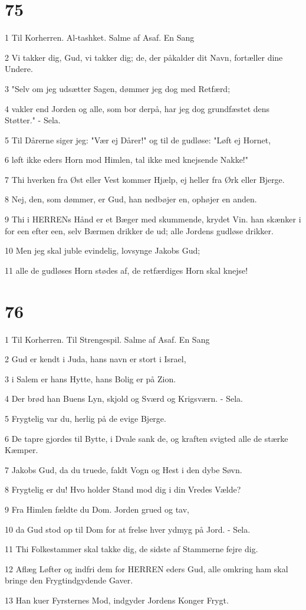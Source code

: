 \chapter{75}

\par 1 Til Korherren. Al-tashket. Salme af Asaf. En Sang
\par 2 Vi takker dig, Gud, vi takker dig; de, der påkalder dit Navn, fortæller dine Undere.
\par 3 "Selv om jeg udsætter Sagen, dømmer jeg dog med Retfærd;
\par 4 vakler end Jorden og alle, som bor derpå, har jeg dog grundfæstet dens Støtter." - Sela.
\par 5 Til Dårerne siger jeg: "Vær ej Dårer!" og til de gudløse: "Løft ej Hornet,
\par 6 løft ikke eders Horn mod Himlen, tal ikke med knejsende Nakke!"
\par 7 Thi hverken fra Øst eller Vest kommer Hjælp, ej heller fra Ørk eller Bjerge.
\par 8 Nej, den, som dømmer, er Gud, han nedbøjer en, ophøjer en anden.
\par 9 Thi i HERRENs Hånd er et Bæger med skummende, krydet Vin. han skænker i for een efter een, selv Bærmen drikker de ud; alle Jordens gudløse drikker.
\par 10 Men jeg skal juble evindelig, lovsynge Jakobs Gud;
\par 11 alle de gudløses Horn stødes af, de retfærdiges Horn skal knejse!

\chapter{76}

\par 1 Til Korherren. Til Strengespil. Salme af Asaf. En Sang
\par 2 Gud er kendt i Juda, hans navn er stort i Israel,
\par 3 i Salem er hans Hytte, hans Bolig er på Zion.
\par 4 Der brød han Buens Lyn, skjold og Sværd og Krigsværn. - Sela.
\par 5 Frygtelig var du, herlig på de evige Bjerge.
\par 6 De tapre gjordes til Bytte, i Dvale sank de, og kraften svigted alle de stærke Kæmper.
\par 7 Jakobs Gud, da du truede, faldt Vogn og Hest i den dybe Søvn.
\par 8 Frygtelig er du! Hvo holder Stand mod dig i din Vredes Vælde?
\par 9 Fra Himlen fældte du Dom. Jorden grued og tav,
\par 10 da Gud stod op til Dom for at frelse hver ydmyg på Jord. - Sela.
\par 11 Thi Folkestammer skal takke dig, de sidste af Stammerne fejre dig.
\par 12 Aflæg Løfter og indfri dem for HERREN eders Gud, alle omkring ham skal bringe den Frygtindgydende Gaver.
\par 13 Han kuer Fyrsternes Mod, indgyder Jordens Konger Frygt.

